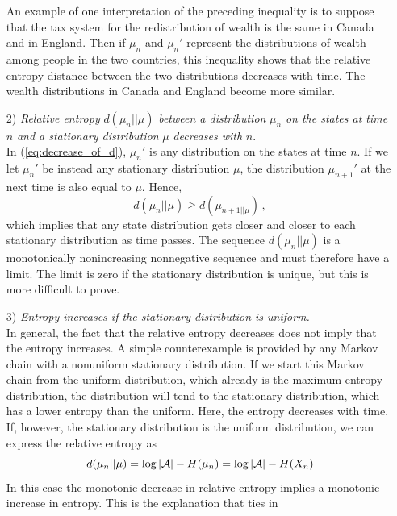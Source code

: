 \begin{itemize}
    An example of one interpretation of the preceding inequality is
    to suppose that the tax system for the redistribution of wealth is
    the same in Canada and in England.  Then if $\mu_n$ and $ \mu_n'$ represent
    the distributions of wealth among people in the two countries, this
    inequality shows that the relative entropy distance between the two
    distributions decreases with time. The wealth distributions in Canada
    and England become more similar.
    \item[2)] \textit{Relative entropy} $d(\mu_n || \mu)$ \textit{between a distribution} $\mu_n$ \textit{on the states at time} $n$ \textit{and a stationary distribution} $\mu$ \textit{decreases with} $n$. 
    \\In (\ref{eq:decrease_of_d}), $\mu_n'$ is any distribution on the states at time $n$. If we let $\mu_n'$ be instead any stationary distribution $\mu$, the distribution $\mu_{n+1}'$ at the next time is also equal to $\mu$. Hence, 
    \begin{equation}
        d(\mu_n || \mu) \geq d(\mu_{n+1 || \mu}) \, ,
    \end{equation}
    which implies that any state distribution gets closer and closer to each stationary distribution as time passes. The sequence $d(\mu_n || \mu)$ is a monotonically nonincreasing nonnegative sequence and must therefore have a limit. The limit is zero if the stationary distribution is unique, but this is more difficult to prove.
    \item[3)] \textit{Entropy increases if the stationary distribution is uniform.} 
    \\ In general, the fact that the relative entropy decreases does not imply that
    the entropy increases. A simple counterexample is provided by any
    Markov chain with a nonuniform stationary distribution. If we start this Markov chain from the uniform distribution, which already is
    the maximum entropy distribution, the distribution will tend to the
    stationary distribution, which has a lower entropy than the uniform.
    Here, the entropy decreases with time.\\
    If, however, the stationary distribution is the uniform distribution, we can express the relative entropy as 
    \begin{equation}
        d(\mu_n || \mu) = \log |\mathcal{A}| - H(\mu_n) = \log |\mathcal{A}| - H(X_n)
    \end{equation}
    In this case the monotonic decrease in relative entropy implies a
    monotonic increase in entropy. This is the explanation that ties in

\end{itemize}
